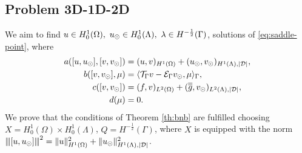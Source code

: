\documentclass[r]{siamart171218}
\begin{document}
\subsection{Problem 3D-1D-2D}
We aim to find $u \in H^1_0(\Omega),\ u_{\odot} \in H_0^1(\Lambda), \ \lambda \in H^{-\frac12}(\Gamma )$,
solutions of \eqref{eq:saddle-point}, where
\begin{align*}
a([u, u_{\odot}], [v, v_{\odot}])&= (u,v)_{H^1(\Omega)} + (u_{\odot},v_{\odot})_{H^1(\Lambda),|\mathcal{D}|},
\\
b([v, v_{\odot}], \mu)&= \langle {\mathcal{T}_\Gamma} v - \mathcal{E}_\Gamma v_{\odot} , \mu \rangle_\Gamma,
\\
c([v,v_{\odot}])&= (f,v)_{L^2(\Omega)} + (\overline{\overline{g}},v_{\odot})_{L^2(\Lambda),|\mathcal{D}|},
\\
d(\mu)&=0.
\end{align*}
We prove that the conditions of Theorem \ref{th:bnb} are fulfilled choosing 
$X=H^1_0(\Omega) \times H^1_0(\Lambda)$, $Q=H^{-\frac 12}(\Gamma)$, where $X$  is equipped with the norm ${\left\vert\kern-0.25ex\left\vert\kern-0.25ex\left\vert [u,u_{\odot} ] \right\vert\kern-0.25ex\right\vert\kern-0.25ex\right\vert}^2=\|u\|^2_{H^1(\Omega)} + \|u_{\odot}\|^2_{H^1(\Lambda),|\mathcal{D}|}$.
\end{document}
